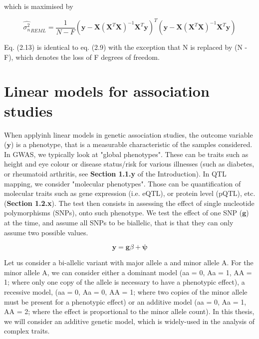 which is maximised by

\begin{equation}\label{eq11:Linear_regression_REML_sigma}
\hat{\sigma_n^2}_{REML} =  \frac{1}{N-F}(\mathbf{y}-\mathbf{X}(\mathbf{X}^T\mathbf{X})^{-1}\mathbf{X}^T\mathbf{y})^T(\mathbf{y}-\mathbf{X}(\mathbf{X}^T\mathbf{X})^{-1}\mathbf{X}^T\mathbf{y})
\end{equation}

Eq. (2.13) is identical to eq. (2.9) with the exception that N is replaced by (N - F), which denotes the loss of F degrees of freedom.


\section{Linear models for association studies}

When applyinh linear models in genetic association studies, the outcome variable ($\mathbf{y}$) is a phenotype, that is a measurable characteristic of the samples considered. 
In GWAS, we typically look at "global phenotypes".
These can be traits such as height and eye colour or disease status/risk for various illnesses (such as diabetes, or rheumatoid arthritis, see \textbf{Section 1.1.y} of the Introduction).
In QTL mapping, we consider "molecular phenotypes". 
Those can be quantification of molecular traits such as gene expression (i.e. eQTL), or protein level (pQTL), etc. (\textbf{Section 1.2.x}).
The test then consists in assessing the effect of single nucleotide polymorphisms (SNPs),  onto such phenotype. 
We test the effect of one SNP ($\mathbf{g}$) at the time, and assume all SNPs to be biallelic, that is that they can only assume two possible values. 

\begin{equation}\label{eq12:Linear_regression_genetics}
 \mathbf{y} = \mathbf{g}\beta + \boldsymbol{\psi} 
\end{equation}

Let us consider a bi-allelic variant with major allele a and minor allele A. 
For the minor allele A, we can consider either a dominant model (aa = 0, Aa = 1, AA = 1; where only one copy of the allele is necessary to have a phenotypic effect), a recessive model, (aa = 0, Aa = 0, AA = 1; where two copies of the minor allele must be present for a phenotypic effect) or an additive model (aa = 0, Aa = 1, AA = 2; where the effect is proportional to the minor allele count). 
In this thesis, we will consider an additive genetic model, which is widely-used in the analysis of complex traits.

